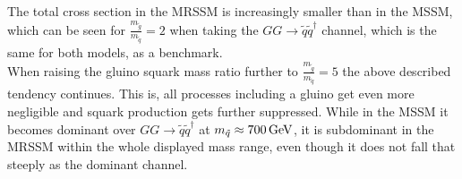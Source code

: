 The total cross section in the MRSSM is increasingly smaller than in the MSSM, which can be seen for $\frac{m_{\tilde{g}}}{m_{\tilde{q}}} = 2$ when taking the  $GG \to \tilde{q}\tilde{q}^\dagger$ channel, which is the same for both models, as a benchmark.\\
When raising the gluino squark mass ratio further to $\frac{m_{\tilde{g}}}{m_{\tilde{q}}} = 5$ the above described tendency continues. This is, all processes including a gluino get even more negligible and squark production gets further suppressed. While in the MSSM it becomes dominant over $GG \to \tilde{q}\tilde{q}^\dagger$ at $m_{\tilde{q}} \approx \unit[700]{GeV}$, it is subdominant in the MRSSM within the whole displayed mass range, even though it does not fall that steeply as the dominant channel.\\

